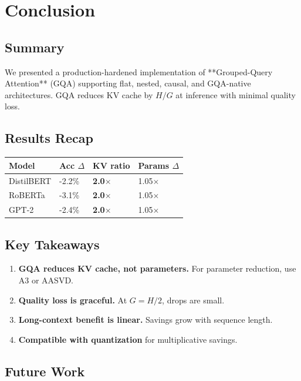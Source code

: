 
\section{Conclusion}

\subsection{Summary}

We presented a production-hardened implementation of **Grouped-Query 
Attention** (GQA) supporting flat, nested, causal, and GQA-native 
architectures. GQA reduces KV cache by $H / G$ at inference with minimal 
quality loss.

\subsection{Results Recap}

\begin{table}[H]
\centering
\small
\begin{tabular}{llll}
\toprule
\textbf{Model} & \textbf{Acc $\Delta$} & \textbf{KV ratio} & \textbf{Params $\Delta$} \\
\midrule
DistilBERT & -2.2\% & \textbf{2.0$\times$} & 1.05$\times$ \\
RoBERTa & -3.1\% & \textbf{2.0$\times$} & 1.05$\times$ \\
GPT-2 & -2.4\% & \textbf{2.0$\times$} & 1.05$\times$ \\
\bottomrule
\end{tabular}
\end{table}

\subsection{Key Takeaways}

\begin{enumerate}
\item \textbf{GQA reduces KV cache, not parameters.} For parameter reduction, use
  A3 or AASVD.
\item \textbf{Quality loss is graceful.} At $G = H/2$, drops are small.
\item \textbf{Long-context benefit is linear.} Savings grow with sequence length.
\item \textbf{Compatible with quantization} for multiplicative savings.

\end{enumerate}
\subsection{Future Work}

